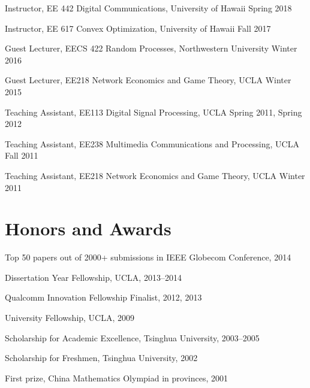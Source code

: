 \documentclass[margin,line]{res}
\begin{document}
\begin{resume}
\vspace{-.3cm} Instructor, EE 442 Digital Communications, University of Hawaii \hfill Spring 2018

\vspace{-.3cm} Instructor, EE 617 Convex Optimization, University of Hawaii \hfill Fall 2017

\vspace{-.3cm} Guest Lecturer, EECS 422 Random Processes, Northwestern University \hfill Winter 2016

\vspace{-.3cm} Guest Lecturer, EE218 Network Economics and Game Theory, UCLA \hfill Winter 2015

\vspace{-.3cm} Teaching Assistant, EE113 Digital Signal Processing, UCLA \hfill Spring 2011, Spring 2012

\vspace{-.3cm} Teaching Assistant, EE238 Multimedia Communications and Processing, UCLA \hfill Fall 2011

\vspace{-.3cm} Teaching Assistant, EE218 Network Economics and Game Theory, UCLA \hfill Winter 2011



\section{\sc Honors and Awards}
Top 50 papers out of 2000+ submissions in IEEE Globecom Conference, \hfill 2014

\vspace*{-2.5mm} Dissertation Year Fellowship, UCLA, \hfill 2013--2014

\vspace*{-2.5mm} Qualcomm Innovation Fellowship Finalist, \hfill 2012, 2013

\vspace*{-2.5mm} University Fellowship, UCLA, \hfill 2009

\vspace*{-2.5mm} Scholarship for Academic Excellence, Tsinghua University, \hfill 2003--2005

\vspace*{-2.5mm} Scholarship for Freshmen, Tsinghua University, \hfill 2002

\vspace*{-2.5mm} First prize, China Mathematics Olympiad in
provinces, \hfill 2001





\end{resume}
\end{document}
